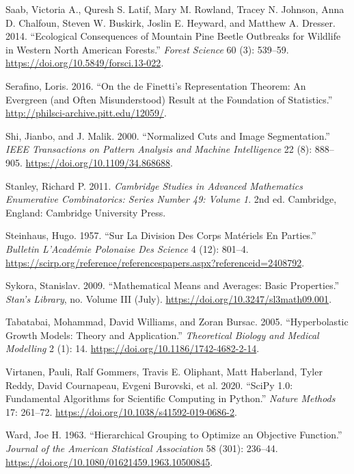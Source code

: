 \documentclass[
  letterpaper,
  DIV=11,
  numbers=noendperiod]{scrreprt}
\newlength{\cslhangindent}
\newenvironment{CSLReferences}[2] %
 {\begin{list}{}{%
  \setlength{\itemindent}{0pt}
  \setlength{\leftmargin}{0pt}
  \setlength{\parsep}{0pt}
  \ifodd #1
   \setlength{\leftmargin}{\cslhangindent}
   \setlength{\itemindent}{-1\cslhangindent}
  \fi
  \setlength{\itemsep}{#2\baselineskip}}}
 {\end{list}}
\begin{document}
\begin{CSLReferences}{1}{0}
Saab, Victoria A., Quresh S. Latif, Mary M. Rowland, Tracey N. Johnson,
Anna D. Chalfoun, Steven W. Buskirk, Joslin E. Heyward, and Matthew A.
Dresser. 2014. {``Ecological Consequences of Mountain Pine Beetle
Outbreaks for Wildlife in Western North American Forests.''}
\emph{Forest Science} 60 (3): 539--59.
\url{https://doi.org/10.5849/forsci.13-022}.

Serafino, Loris. 2016. {``On the de Finetti's Representation Theorem: An
Evergreen (and Often Misunderstood) Result at the Foundation of
Statistics.''} \url{http://philsci-archive.pitt.edu/12059/}.

Shi, Jianbo, and J. Malik. 2000. {``Normalized Cuts and Image
Segmentation.''} \emph{IEEE Transactions on Pattern Analysis and Machine
Intelligence} 22 (8): 888--905. \url{https://doi.org/10.1109/34.868688}.

Stanley, Richard P. 2011. \emph{Cambridge Studies in Advanced
Mathematics Enumerative Combinatorics: Series Number 49: Volume 1}. 2nd
ed. Cambridge, England: Cambridge University Press.

Steinhaus, Hugo. 1957. {``Sur La Division Des Corps Matériels En
Parties.''} \emph{Bulletin L'Académie Polonaise Des Science} 4 (12):
801--4.
\url{https://scirp.org/reference/referencespapers.aspx?referenceid=2408792}.

Sykora, Stanislav. 2009. {``Mathematical Means and Averages: Basic
Properties.''} \emph{Stan's Library}, no. Volume III (July).
\url{https://doi.org/10.3247/sl3math09.001}.

Tabatabai, Mohammad, David Williams, and Zoran Bursac. 2005.
{``Hyperbolastic Growth Models: Theory and Application.''}
\emph{Theoretical Biology and Medical Modelling} 2 (1): 14.
\url{https://doi.org/10.1186/1742-4682-2-14}.

Virtanen, Pauli, Ralf Gommers, Travis E. Oliphant, Matt Haberland, Tyler
Reddy, David Cournapeau, Evgeni Burovski, et al. 2020. {``{{SciPy} 1.0:
Fundamental Algorithms for Scientific Computing in Python}.''}
\emph{Nature Methods} 17: 261--72.
\url{https://doi.org/10.1038/s41592-019-0686-2}.

Ward, Joe H. 1963. {``Hierarchical Grouping to Optimize an Objective
Function.''} \emph{Journal of the American Statistical Association} 58
(301): 236--44. \url{https://doi.org/10.1080/01621459.1963.10500845}.


\end{CSLReferences}
\end{document}
